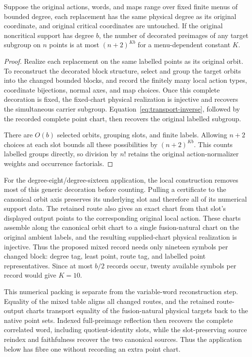 \begin{proposition}\label{prop:decoration}
Suppose the original actions, words, and maps range over fixed finite
menus of bounded degree, each replacement has the same physical degree
as its original coordinate, and original critical coordinates are
untouched. If the original noncritical support has degree $b$, the
number of decorated preimages of any target subgroup on $n$ points is
at most $(n+2)^{K b}$ for a menu-dependent constant $K$.
\end{proposition}
\begin{proof}
Realize each replacement on the same labelled points as its original
orbit. To reconstruct the decorated block structure, select and group
the target orbits into the changed bounded blocks, and record the
finitely many local action types, coordinate bijections, normal axes,
and map choices.  Once this complete decoration is fixed, the fixed-chart
physical realization is injective and recovers the simultaneous carrier
subgroup.  Equation~\eqref{eq:transport-inverse}, followed by the recorded
complete point chart, then recovers the original labelled subgroup.

There are $O(b)$ selected orbits, grouping slots, and finite labels.
Allowing $n+2$ choices at each slot bounds all these possibilities by
$(n+2)^{K b}$.
This counts labelled groups directly, so division by $n!$ retains
the original action-normalizer weights and occurrence factorials.
\end{proof}

For the degree-eight/degree-sixteen application, the local construction
removes most of this generic decoration before counting.  Pulling a
certificate to the canonical orbit axis preserves its underlying slot and
therefore all of its numerical support data.  The retained route also gives
an exact chart from that slot's displayed output points to the corresponding
original local action.  These charts assemble along the canonical orbit
chart to a single fusion-natural chart on the original ambient labels, and
the resulting supplied-chart physical realization is injective.  Thus the
proposed mixed record needs only nineteen symbols per changed block: degree
tag, least point, route tag, and labelled point representatives.  Since at
most $b/2$ records occur, twenty available symbols per record would give
$K=10$.

This numerical packing is separate from the variable-word reconstruction
step.  Equality of the mixed table aligns all changed routes, and the retained
route-output charts transport equality of the fusion-natural physical targets
back to the native point sets.  Indexed full-preimage reflection then recovers
the complete correlated word, including quotient-identity slots, while the
slot-preserving source reindex and faithfulness recover the two canonical
sources.  Thus the application below has fibre one without recording an
extra point chart.

